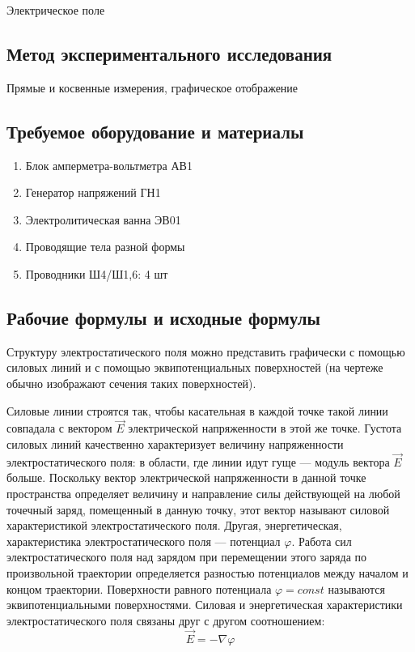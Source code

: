 \documentclass[12pt, a4paper]{article}
\begin{document}
Электрическое поле

\subsection*{Метод экспериментального исследования}

Прямые и косвенные измерения, графическое отображение

\subsection*{Требуемое оборудование и материалы}

\begin{enumerate}
\item Блок амперметра-вольтметра АВ1
\item Генератор напряжений ГН1
\item Электролитическая ванна ЭВ01
\item Проводящие тела разной формы
\item Проводники Ш4/Ш1,6: 4 шт
\end{enumerate}

\subsection*{Рабочие формулы и исходные формулы}

Структуру электростатического поля можно представить графически с
помощью силовых линий и с помощью эквипотенциальных поверхностей (на
чертеже обычно изображают сечения таких поверхностей).

Силовые линии строятся так, чтобы касательная в каждой точке такой
линии совпадала с вектором $\vec{E}$ электрической напряженности в этой же точке.
Густота силовых линий качественно характеризует величину напряженности
электростатического поля: в области, где линии идут гуще — модуль вектора $\vec{E}$
больше. Поскольку вектор электрической напряженности в данной точке
пространства определяет величину и направление силы действующей на любой
точечный заряд, помещенный в данную точку, этот вектор называют силовой
характеристикой электростатического поля.
Другая, энергетическая, характеристика электростатического поля —
потенциал $\varphi$. Работа сил электростатического поля над зарядом при
перемещении этого заряда по произвольной траектории определяется
разностью потенциалов между началом и концом траектории. Поверхности
равного потенциала $\varphi = const$ называются эквипотенциальными поверхностями.
Силовая и энергетическая характеристики электростатического поля
связаны друг с другом соотношением:
\begin{equation}
\vec{E} = -\nabla\varphi
\end{equation}
\end{document}
